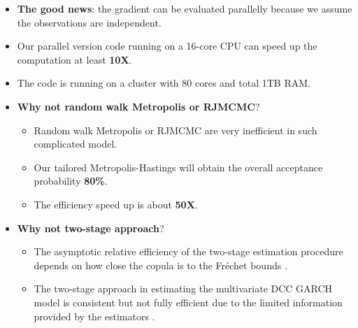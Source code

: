 \documentclass{beamer}
\begin{document}
\begin{frame}[allowframebreaks]
\begin{itemize}
\begin{itemize}
    \end{itemize}

  \item \textbf{The good news}: the gradient can be evaluated parallelly because we assume
    the observations are independent.

  \item Our parallel version code running on a 16-core CPU can speed up the
    computation at least \textbf{10X}.

  \item The code is running on a cluster with 80 cores and total 1TB RAM.

  \item \textbf{Why not random walk Metropolis or RJMCMC}?

    \begin{itemize}
    \item Random walk Metropolis or RJMCMC are very inefficient in such complicated model.
    \item Our tailored Metropolis-Hastings will obtain the overall acceptance probability
      \textbf{80\%}.
    \item The efficiency speed up is about \textbf{50X}.
    \end{itemize}

\newpage
  \item \textbf{Why not two-stage approach}?

    \begin{itemize}
    \item The asymptotic relative efficiency of the two-stage estimation procedure depends
      on how close the copula is to the Fr\'echet bounds
      {\color{blue}\citep{joe2005asymptotic}}.
    \item The two-stage approach in estimating the multivariate DCC GARCH model is
      consistent but not fully efficient due to the limited information provided by the
      estimators {\color{blue}\citep{engle2001theoretical}}.

    \end{itemize}

  \end{itemize}
\end{frame}
\end{document}
